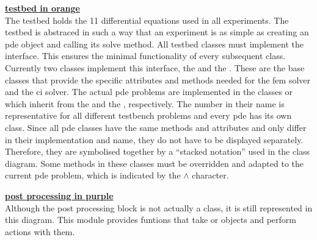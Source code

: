 \documentclass[./\jobname.tex]{subfiles}
\begin{document}
\textcolor{testbed_colour}{\large \underline{\textbf{testbed in orange}}} \\
The testbed holds the 11 differential equations used in all experiments. The testbed is abstraced in such a way that an experiment is as simple as creating an \gls{pde} object and calling its solve method. All testbed classes must implement the  interface. This ensures the minimal functionality of every subsequent class. Currently two classes implement this interface, the  and the . These are the base classes that provide the specific attributes and methods needed for the \gls{fem} solver and the \gls{ci} solver. The actual \gls{pde} problems are implemented in the classes  or  which inherit from the  and the , respectively. The number in their name is representative for all different testbench problems and every \gls{pde} has its own class. Since all \gls{pde} classes have the same methods and attributes and only differ in their implementation and name, they do not have to be displayed separately. Therefore, they are symbolised together by a ``stacked notation'' used in the class diagram. Some methods in these classes must be overridden and adapted to the current \gls{pde} problem, which is indicated by the $\land$ character.

\textcolor{post_proc_colour}{\large \underline{\textbf{post processing in purple}}} \\
Although the post processing block is not actually a class, it is still represented in this diagram. This module provides funtions that take  or  objects and perform actions with them. 
\end{document}
